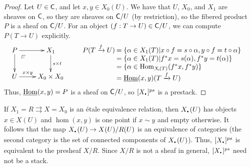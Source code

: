  \begin{proof}
   Let $U\in \text{\sf C}$, and let $x,y\in X_0(U)$. We have that $U$, $X_0$, and $X_1$ are sheaves
   on $\text{\sf C}$, so they are sheaves on $\text{\sf C}/U$ (by restriction), so the fibered product $P$ is
   a sheaf on $\text{\sf C}/U$. For an object $(f:T\to U)\in \text{\sf C}/U$, we can compute $P(T\to U)$
   explicitly.
   \[
   \xymatrix{
    P \ar[r]\ar[d]\ar@{}[dr]|(.25)\pb & X_1\ar[d]^{s\times t}\\
    U\ar[r]^<>(.5){x\times y} & X_0\times X_0
   }\qquad
   \begin{array}[t]{r@{\:}l}
     P(T\xrightarrow{f} U) &= \{\alpha\in X_1(T)| x\circ f=s\circ \alpha, y\circ f=t\circ \alpha\} \\
     & = \{\alpha\in X_1(T)| f^*x=s(\alpha), f^*y=t(\alpha)\}\\
     & = \{\alpha \in \hom_{X_\uudot(T)}(f^*x,f^*y)\}\\
     &= \uhom(x,y)(T\xrightarrow{f} U)
   \end{array}
   \]
    Thus, $\operatorname{\underline{Hom}}(x,y)=P$ is a sheaf on $\text{\sf C}/U$, so $[X_\udot]^{ps}$ is a prestack.
 \end{proof}

%
 \begin{example}\label{lec25Eg:etale_relation}
   If $X_1=R\rightrightarrows X=X_0$ is an \'etale equivalence relation, then
   $X_\udot(U)$ has objects $x\in X(U)$ and $\hom(x,y)$ is one point if $x\sim y$ and
   empty otherwise. It follows that the map $X_\udot(U)\to X(U)/R(U)$ is an equivalence
   of categories (the second category is the set of connected components of
   $X_\udot(U)$). Thus, $[X_\udot]^{ps}$ is equivalent to the presheaf $X/R$. Since $X/R$
   is not a sheaf in general, $[X_\udot]^{ps}$ need not be a stack.
 \end{example}

